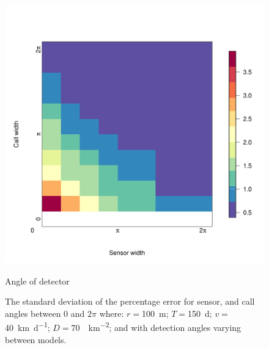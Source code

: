 \documentclass[a4paper,10pt,reqno,oneside]{amsart}
\begin{document}
\begin{figure}[t]
        \centering
		\includegraphics[width=1\textwidth]{imgs/ResultStandardDeviation.pdf}
		\caption{Angle of detector}
		\label{f:StandardDevaition}
        \caption{The standard deviation of the percentage error for sensor, and call angles between 0 and $2\pi$ where: $r = $\SI{100}{\meter}; $T = $\SI{150}{\day}; $v = $ \SI{40}{\kilo\meter\per\day}; $D=$\SI{70}{\animals\per\kilo\meter\squared}; and with detection angles varying between models.        } 
\end{figure}
\end{document}
